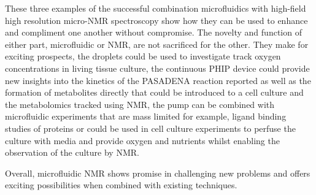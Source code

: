 These three examples of the successful combination microfluidics with high-field high resolution micro-NMR
spectroscopy show how they can be used to enhance and compliment one another without compromise. The
novelty and function of either part, microfluidic or NMR, are not sacrificed for the other. They make
for exciting prospects, the droplets could be used to investigate track oxygen concentrations in living
tissue culture, the continuous PHIP device could provide new insights into the kinetics of the PASADENA
reaction reported as well as the formation of metabolites directly that could be introduced to a cell culture and
the metabolomics tracked using NMR, the pump can be combined with microfluidic experiments that are mass limited
for example, ligand binding studies of proteins or could be used in cell culture experiments to perfuse the
culture with media and provide oxygen and nutrients whilst enabling the observation of the culture by NMR.

Overall, microfluidic NMR shows promise in challenging new problems and offers exciting possibilities
when combined with existing techniques. 
